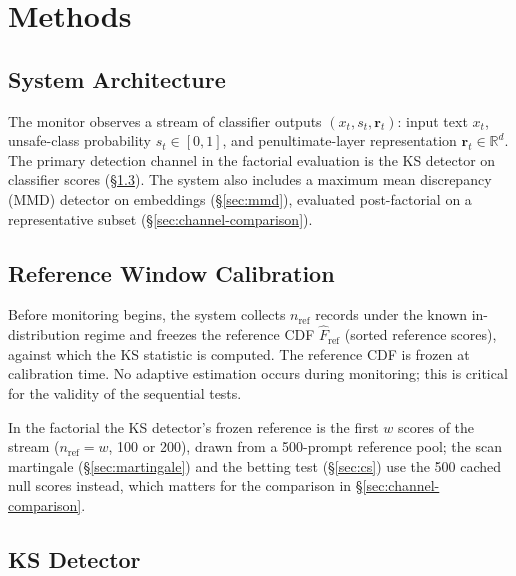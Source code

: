\documentclass{article}
\begin{document}
\section{Methods}
\label{sec:methods}

\subsection{System Architecture}
\label{sec:architecture}

The monitor observes a stream of classifier outputs $(x_t, s_t, \mathbf{r}_t)$: input text $x_t$, unsafe-class probability $s_t \in [0,1]$, and penultimate-layer representation $\mathbf{r}_t \in \mathbb{R}^d$. The primary detection channel in the factorial evaluation is the KS detector on classifier scores (\S\ref{sec:ks}). The system also includes a maximum mean discrepancy (MMD) detector on embeddings (\S\ref{sec:mmd}), evaluated post-factorial on a representative subset (\S\ref{sec:channel-comparison}).

\subsection{Reference Window Calibration}
\label{sec:reference}

Before monitoring begins, the system collects $n_{\text{ref}}$ records under the known in-distribution regime and freezes the reference CDF $\hat{F}_{\text{ref}}$ (sorted reference scores), against which the KS statistic is computed. The reference CDF is frozen at calibration time. No adaptive estimation occurs during monitoring; this is critical for the validity of the sequential tests.

In the factorial the KS detector's frozen reference is the first $w$ scores of the stream ($n_{\text{ref}}{=}w$, 100 or 200), drawn from a 500-prompt reference pool; the scan martingale (\S\ref{sec:martingale}) and the betting test (\S\ref{sec:cs}) use the 500 cached null scores instead, which matters for the comparison in \S\ref{sec:channel-comparison}.

\subsection{KS Detector}
\label{sec:ks}
\end{document}
